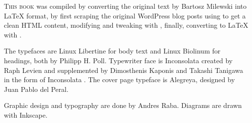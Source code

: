 \lettrine[lraise=-0.03,loversize=0.08]{T}{his book} was compiled by converting the original text by Bartosz Milewski into \LaTeX{} format, by
first scraping the original WordPress blog posts using 
to get a clean HTML content, modifying and tweaking with ,
finally, converting to LaTeX with .

The typefaces are Linux Libertine for body text and Linux Biolinum for headings, both by Philipp H. Poll. Typewriter face is Inconsolata
created by Raph Levien and supplemented by Dimosthenis Kaponis and Takashi Tanigawa in the form of Inconsolata . The cover page
typeface is Alegreya, designed by Juan Pablo del Peral.

Graphic design and typography are done by Andres Raba. Diagrams are drawn with Inkscape.